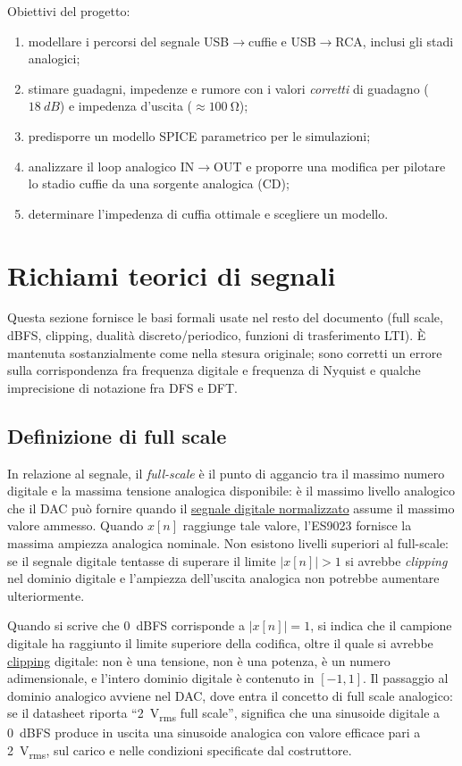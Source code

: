 Obiettivi del progetto:
\begin{enumerate}
  \item modellare i percorsi del segnale USB$\rightarrow$cuffie e
        USB$\rightarrow$RCA, inclusi gli stadi analogici;
  \item stimare guadagni, impedenze e rumore con i valori \emph{corretti}
        di guadagno ($\SI{18}{dB}$) e impedenza d'uscita ($\approx\SI{100}{\ohm}$);
  \item predisporre un modello SPICE parametrico per le simulazioni;
  \item analizzare il loop analogico IN$\rightarrow$OUT e proporre una
        modifica per pilotare lo stadio cuffie da una sorgente analogica (CD);
  \item determinare l'impedenza di cuffia ottimale e scegliere un modello.
\end{enumerate}

\section{Richiami teorici di segnali}\label{sec:teoria}
Questa sezione fornisce le basi formali usate nel resto del documento
(full scale, \si{dBFS}, clipping, dualità discreto/periodico, funzioni di
trasferimento LTI). È mantenuta sostanzialmente come nella stesura
originale; sono corretti un errore sulla corrispondenza fra frequenza
digitale e frequenza di Nyquist e qualche imprecisione di notazione fra
DFS e DFT.

\subsection{Definizione di full scale}
In relazione al segnale, il \emph{full-scale} è il punto di aggancio tra
il massimo numero digitale e la massima tensione analogica disponibile:
è il massimo livello analogico che il DAC può fornire quando il
\hyperref[sec:segnaleDigitale]{segnale digitale normalizzato} assume il
massimo valore ammesso. Quando $x[n]$ raggiunge tale valore, l'ES9023
fornisce la massima ampiezza analogica nominale. Non esistono livelli
superiori al full-scale: se il segnale digitale tentasse di superare il
limite $|x[n]|>1$ si avrebbe \emph{clipping} nel dominio digitale e
l'ampiezza dell'uscita analogica non potrebbe aumentare ulteriormente.

Quando si scrive che \SI{0}{dBFS} corrisponde a $|x[n]|=1$, si indica che
il campione digitale ha raggiunto il limite superiore della codifica,
oltre il quale si avrebbe \hyperref[sec:clipping]{clipping} digitale: non
è una tensione, non è una potenza, è un numero adimensionale, e l'intero
dominio digitale è contenuto in $[-1,1]$. Il passaggio al dominio
analogico avviene nel DAC, dove entra il concetto di full scale
analogico: se il datasheet riporta ``\SI{2}{V_{rms}} full scale'',
significa che una sinusoide digitale a \SI{0}{dBFS} produce in uscita una
sinusoide analogica con valore efficace pari a \SI{2}{V_{rms}}, sul carico
e nelle condizioni specificate dal costruttore.

